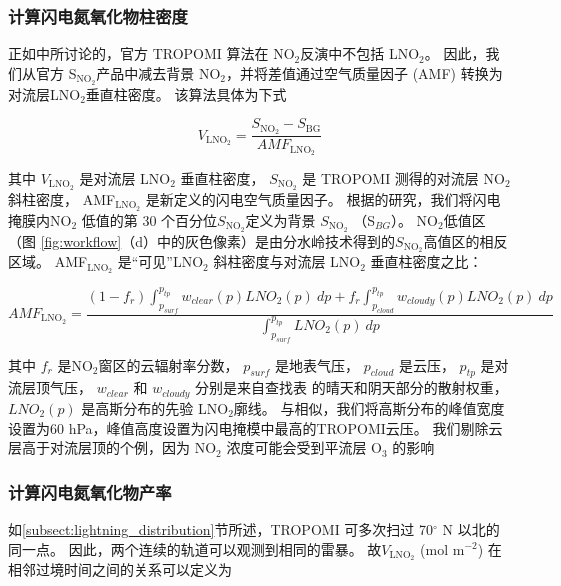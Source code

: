 \subsubsection*{计算闪电氮氧化物柱密度}


正如\citet{Zhang.2022a}中所讨论的，官方 TROPOMI 算法在 NO$_2$反演中不包括 LNO$_2$。
因此，我们从官方 S$_{\textrm{NO$_2$}}$产品中减去背景 NO$_2$，并将差值通过空气质量因子 (AMF) 转换为对流层LNO$_2$垂直柱密度。
该算法具体为下式


\begin{equation} \label{eq:arctic_LNO2}
V_{\textrm{LNO$_2$}} = \frac{S_\textrm{NO$_2$} - S_\textrm{BG}}{AMF_\textrm{LNO$_2$}}
\end{equation}


其中 $V_{\textrm{LNO$_2$}}$ 是对流层 LNO$_2$ 垂直柱密度，
$S_{\textrm{NO$_2$}}$ 是 TROPOMI 测得的对流层 NO$_2$ 斜柱密度，
AMF$_{\textrm{LNO$_2$}}$ 是新定义的闪电空气质量因子。
根据\citet{Allen.2021a}的研究，我们将闪电掩膜内NO$_2$ 低值的第 30 个百分位$S_{\textrm{NO$_2$}}$定义为背景 $S_{\textrm{NO$_2$}}$ （S$_{BG}$）。
NO$_2$低值区（图 \ref{fig:workflow}（d）中的灰色像素）是由分水岭技术得到的$S_{\textrm{NO$_2$}}$高值区的相反区域。
AMF$_\textrm{LNO$_2$}$ 是“可见”LNO$_2$ 斜柱密度与对流层 LNO$_2$ 垂直柱密度之比：

\begin{equation} \label{eq:arctic_AMFLNO2}
AMF_{\textrm{LNO$_2$}} = \frac{(1-f_r) \int_{p_{surf}}^{p_{tp}} w_{clear}(p) LNO_2(p) \: dp + f_r \int_{p_{cloud}}^{p_{tp}} w_{cloudy}(p) LNO_2(p) \: dp}{\int_{p_{surf}}^{p_{tp}} LNO_2(p) \: dp}
\end{equation}

其中 $f_{r}$ 是NO$_2$窗区的云辐射率分数，
$p_{surf}$ 是地表气压，
$p_{cloud}$ 是云压，
$p_{tp}$ 是对流层顶气压，
$w_{clear}$ 和 $w_{cloudy}$ 分别是来自查找表 \citep{Lorente.2017}的晴天和阴天部分的散射权重，
$LNO_2(p)$ 是高斯分布的先验 LNO$_2$廓线。
与\citet{Lapierre.2020}相似，我们将高斯分布的峰值宽度设置为60 hPa，峰值高度设置为闪电掩模中最高的TROPOMI云压。
我们剔除云层高于对流层顶的个例，因为 NO$_2$ 浓度可能会受到平流层 O$_3$ 的影响\citep{Frey.2015a,Zhang.2022a}


\subsubsection*{计算闪电氮氧化物产率}


如\ref{subsect:lightning_distribution}节所述，TROPOMI 可多次扫过 70$^{\circ}$ N 以北的同一点。
因此，两个连续的轨道可以观测到相同的雷暴。
故$V_{\textrm{LNO$_2$}}$ (mol m$^{-2}$) 在相邻过境时间之间的关系可以定义为

